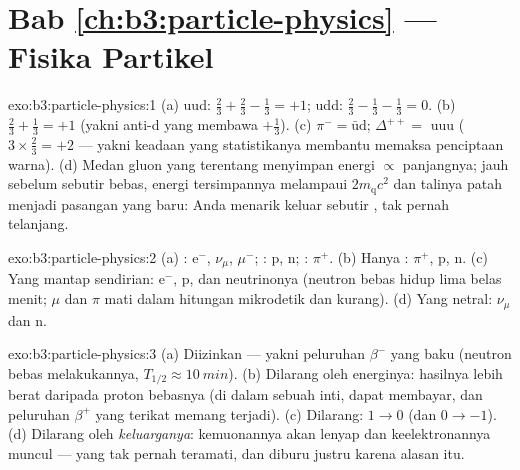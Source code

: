 \section*{Bab \ref{ch:b3:particle-physics} --- Fisika Partikel}

\begin{solution}{exo:b3:particle-physics:1}
(a) uud: $\tfrac23 + \tfrac23 - \tfrac13 = +1$; udd: $\tfrac23 -
\tfrac13 - \tfrac13 = 0$. (b) $\tfrac23 + \tfrac13 = +1$ (yakni
anti-d yang membawa $+\tfrac13$). (c) $\pi^- =
\bar{\text{u}}\text{d}$; $\Delta^{++} =$ uuu ($3\times\tfrac23 =
+2$ --- yakni keadaan yang statistikanya membantu memaksa penciptaan
warna). (d) Medan gluon yang terentang menyimpan energi
$\propto$ panjangnya; jauh sebelum sebutir  bebas, energi tersimpannya
melampaui $2m_{\text{q}}c^2$ dan talinya patah menjadi pasangan
yang baru: Anda menarik keluar sebutir , tak pernah  telanjang.
\end{solution}

\begin{solution}{exo:b3:particle-physics:2}
(a) : e$^-$, $\nu_\mu$, $\mu^-$; : p, n; :
$\pi^+$. (b) Hanya : $\pi^+$, p, n. (c) Yang mantap sendirian:
e$^-$, p, dan neutrinonya (neutron bebas hidup lima belas
menit; $\mu$ dan $\pi$ mati dalam hitungan mikrodetik dan kurang). (d) Yang
netral: $\nu_\mu$ dan n.
\end{solution}

\begin{solution}{exo:b3:particle-physics:3}
(a) Diizinkan --- yakni peluruhan $\beta^-$ yang baku (neutron bebas
melakukannya, $T_{1/2} \approx \qty{10}{min}$). (b) Dilarang oleh energinya:
hasilnya lebih berat daripada proton bebasnya (di dalam sebuah inti,  dapat membayar, dan peluruhan $\beta^+$ yang terikat memang terjadi). (c)
Dilarang:  $1 \to 0$ (dan 
$0 \to -1$). (d) Dilarang oleh  \emph{keluarganya}:
kemuonannya akan lenyap dan keelektronannya muncul --- yang tak pernah
teramati, dan diburu justru karena alasan itu.
\end{solution}

